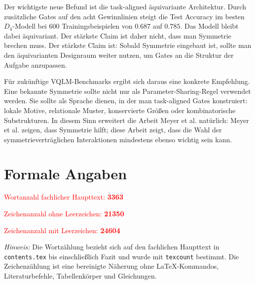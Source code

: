 Der wichtigste neue Befund ist die task-aligned äquivariante Architektur. Durch zusätzliche Gates auf den acht Gewinnlinien steigt die Test Accuracy im besten $D_4$-Modell bei 600 Trainingsbeispielen von $0.687$ auf $0.785$. Das Modell bleibt dabei äquivariant. Der stärkste Claim ist daher nicht, dass man Symmetrie brechen muss. Der stärkste Claim ist: Sobald Symmetrie eingebaut ist, sollte man den äquivarianten Designraum weiter nutzen, um Gates an die Struktur der Aufgabe anzupassen.

Für zukünftige VQLM-Benchmarks ergibt sich daraus eine konkrete Empfehlung. Eine bekannte Symmetrie sollte nicht nur als Parameter-Sharing-Regel verwendet werden. Sie sollte als Sprache dienen, in der man task-aligned Gates konstruiert: lokale Motive, relationale Muster, konservierte Größen oder kombinatorische Substrukturen. In diesem Sinn erweitert die Arbeit Meyer et al. natürlich: Meyer et al. zeigen, dass Symmetrie hilft; diese Arbeit zeigt, dass die Wahl der symmetrieverträglichen Interaktionen mindestens ebenso wichtig sein kann.

\clearpage
\section*{Formale Angaben}

\noindent\textcolor{red}{\Large Wortanzahl fachlicher Haupttext: \textbf{3363}}

\vspace{0.3cm}
\noindent\textcolor{red}{\Large Zeichenanzahl ohne Leerzeichen: \textbf{21350}}

\vspace{0.3cm}
\noindent\textcolor{red}{\Large Zeichenanzahl mit Leerzeichen: \textbf{24604}}

\vspace{0.5cm}
\noindent\emph{Hinweis:} Die Wortzählung bezieht sich auf den fachlichen Haupttext in \texttt{contents.tex} bis einschließlich Fazit und wurde mit \texttt{texcount} bestimmt. Die Zeichenzählung ist eine bereinigte Näherung ohne LaTeX-Kommandos, Literaturbefehle, Tabellenkörper und Gleichungen.
